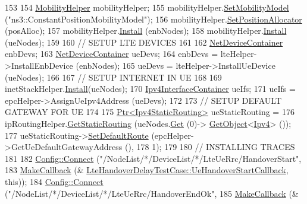 \begin{DoxyCode}
153 
154   \hyperlink{classns3_1_1MobilityHelper}{MobilityHelper} mobilityHelper;
155   mobilityHelper.\hyperlink{classns3_1_1MobilityHelper_a030275011b6f40682e70534d30280aba}{SetMobilityModel} (\textcolor{stringliteral}{"ns3::ConstantPositionMobilityModel"});
156   mobilityHelper.\hyperlink{classns3_1_1MobilityHelper_ac59d5295076be3cc11021566713a28c5}{SetPositionAllocator} (posAlloc);
157   mobilityHelper.\hyperlink{classns3_1_1MobilityHelper_a07737960ee95c0777109cf2994dd97ae}{Install} (enbNodes);
158   mobilityHelper.\hyperlink{classns3_1_1MobilityHelper_a07737960ee95c0777109cf2994dd97ae}{Install} (ueNodes);
159 
160   \textcolor{comment}{// SETUP LTE DEVICES}
161 
162   \hyperlink{classns3_1_1NetDeviceContainer}{NetDeviceContainer} enbDevs;
163   \hyperlink{classns3_1_1NetDeviceContainer}{NetDeviceContainer} ueDevs;
164   enbDevs = lteHelper->InstallEnbDevice (enbNodes);
165   ueDevs = lteHelper->InstallUeDevice (ueNodes);
166 
167   \textcolor{comment}{// SETUP INTERNET IN UE}
168 
169   inetStackHelper.\hyperlink{classns3_1_1InternetStackHelper_a6645b412f31283d2d9bc3d8a95cebbc0}{Install}(ueNodes);
170   \hyperlink{classns3_1_1Ipv4InterfaceContainer}{Ipv4InterfaceContainer} ueIfs;
171   ueIfs = epcHelper->AssignUeIpv4Address (ueDevs);
172 
173   \textcolor{comment}{// SETUP DEFAULT GATEWAY FOR UE}
174 
175   \hyperlink{classns3_1_1Ptr}{Ptr<Ipv4StaticRouting>} ueStaticRouting =
176       ipRoutingHelper.\hyperlink{classns3_1_1Ipv4StaticRoutingHelper_a731206e50d305695dac7fb2ef963a4bb}{GetStaticRouting} (ueNodes.\hyperlink{classns3_1_1NodeContainer_a9ed96e2ecc22e0f5a3d4842eb9bf90bf}{Get} (0)->
      \hyperlink{classns3_1_1Object_a13e18c00017096c8381eb651d5bd0783}{GetObject}<\hyperlink{classns3_1_1Ipv4}{Ipv4}> ());
177   ueStaticRouting->\hyperlink{classns3_1_1Ipv4StaticRouting_aee30fa3246c2b42f122dabdff2725331}{SetDefaultRoute} (epcHelper->GetUeDefaultGatewayAddress (),
178       1);
179 
180   \textcolor{comment}{// INSTALLING TRACES}
181 
182   \hyperlink{group__config_ga4014f151241cd0939b6cb64409605736}{Config::Connect} (\textcolor{stringliteral}{"/NodeList/*/DeviceList/*/LteUeRrc/HandoverStart"},
183       \hyperlink{group__makecallbackmemptr_ga9376283685aa99d204048d6a4b7610a4}{MakeCallback} (&
      \hyperlink{classLteHandoverDelayTestCase_a7264e1ec847d4af71168e6bbc0470ca4}{LteHandoverDelayTestCase::UeHandoverStartCallback}, \textcolor{keyword}{this}));
184   \hyperlink{group__config_ga4014f151241cd0939b6cb64409605736}{Config::Connect} (\textcolor{stringliteral}{"/NodeList/*/DeviceList/*/LteUeRrc/HandoverEndOk"},
185       \hyperlink{group__makecallbackmemptr_ga9376283685aa99d204048d6a4b7610a4}{MakeCallback} (&

\end{DoxyCode}
